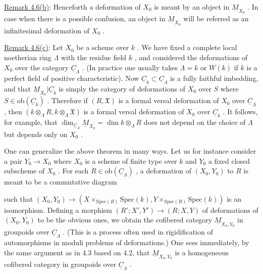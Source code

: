 \underline{Remark 4.6(b)}:  Henceforth a deformation of  $X_{0}$  is meant by an object in  $\underline{M}_{X_{0}}$  . In case when there is a possible confusion, an object in  $\underline{M}_{X_{0}}$  will be referred as an infinitesimal deformation of  $X_{0}$  .

\underline{Remark 4.6(c)}:  Let  $X_{0}$  be a scheme over  $k$  . We have fixed a complete local noetherian ring  $\Lambda$  with the residue field  $k$  , and considered the deformations
of  $X_{0}$  over the category  $\underline{C}_{\Lambda}$  . (In practice one usually takes  $\Lambda = k$  or  $W(k)$ if  $k$  is a perfect field of positive characteristic). Now  $\underline{C}_{k} \subset \underline{C}_{\Lambda}$  is a fully faithful imbedding, and that  $\underline{M}_{X_{0}}|\underline{C}_{k}$  is simply the category of deformations of $X_{0}$  over  $S$  where  $S \in \mathrm{ob}(\underline{C}_{k})$  . Therefore if  $(R, \mathfrak{X})$  is a formal versal deformation of  $X_{0}$  over  $\underline{C}_{\Lambda}$  , then  $(k \otimes_{\Lambda} R, k \otimes_{\Lambda} \mathfrak{X})$  is a formal versal deformation of $X_{0}$  over  $\underline{C}_{k}$  . It follows, for example, that  $\dim_{\underline{C}_{\Lambda}} \underline{M}_{X_{0}} = \dim k \otimes_{\Lambda} R$  does not depend on the choice of  $\Lambda$  but depends only on  $X_{0}$  .

          One can generalize the above theorem in many ways. Let us for instance consider a pair  $Y_{0} \to X_{0}$  where  $X_{0}$  is a scheme of finite type over  $k$  and  $Y_{0}$ a fixed closed subscheme of  $X_{0}$  . For each  $R \in \mathrm{ob}(\underline{C}_{\Lambda})$  , a deformation of $(X_{0}, Y_{0})$  to  $R$  is meant to be a commutative diagram

such that  $(X_{0}, Y_{0}) \to (X \times_{\mathrm{Spec}(R)} \mathrm{Spec}(k), Y \times_{\mathrm{Spec}(R)} \mathrm{Spec}(k))$  is an isomorphism. Defining a morphism  $(R'; X', Y') \to (R; X, Y)$  of deformations of  $(X_{0}, Y_{0})$  to be the obvious ones, we obtain the cofibered category  $\underline{M}_{X_{0},Y_{0}}$  in groupoids over $\underline{C}_{\Lambda}$  . (This is a process often used in rigidification of automorphisms in moduli problems of deformations.) One sees immediately, by the same argument as in 4.3 based on 4.2, that  $\underline{M}_{X_{0},Y_{0}}$  is a homogeneous cofibered category in groupoids over $\underline{C}_{\Lambda}$  .

